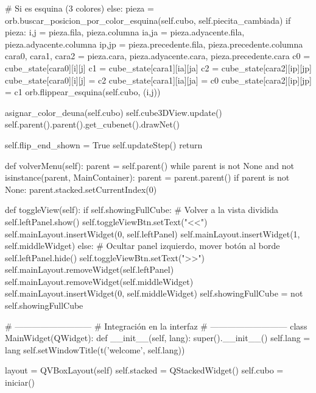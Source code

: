             # Si es esquina (3 colores)
            else:
                pieza = orb.buscar_posicion_por_color_esquina(self.cubo, self.piecita_cambiada)
                if pieza:
                    i,j   = pieza.fila, pieza.columna
                    ia,ja = pieza.adyacente.fila, pieza.adyacente.columna
                    ip,jp = pieza.precedente.fila, pieza.precedente.columna
                    cara0, cara1, cara2 = pieza.cara, pieza.adyacente.cara, pieza.precedente.cara
                    c0 = cube_state[cara0][i][j]
                    c1 = cube_state[cara1][ia][ja]
                    c2 = cube_state[cara2][ip][jp]
                    cube_state[cara0][i][j] = c2
                    cube_state[cara1][ia][ja] = c0
                    cube_state[cara2][ip][jp] = c1
                    orb.flippear_esquina(self.cubo, (i,j))

            asignar_color_deuna(self.cubo)
            self.cube3DView.update()
            self.parent().parent().get_cubenet().drawNet()

            self.flip_end_shown = True
            self.updateStep()
            return

    def volverMenu(self):
        parent = self.parent()
        while parent is not None and not isinstance(parent, MainContainer):
            parent = parent.parent()
        if parent is not None:
            parent.stacked.setCurrentIndex(0)  

    def toggleView(self):
        if self.showingFullCube:
            # Volver a la vista dividida
            self.leftPanel.show()
            self.toggleViewBtn.setText("<<")
            self.mainLayout.insertWidget(0, self.leftPanel)
            self.mainLayout.insertWidget(1, self.middleWidget)
        else:
            # Ocultar panel izquierdo, mover botón al borde
            self.leftPanel.hide()
            self.toggleViewBtn.setText(">>")
            self.mainLayout.removeWidget(self.leftPanel)
            self.mainLayout.removeWidget(self.middleWidget)
            self.mainLayout.insertWidget(0, self.middleWidget)
        self.showingFullCube = not self.showingFullCube


# ---------------------------
# Integración en la interfaz
# ---------------------------
class MainWidget(QWidget):
    def __init__(self, lang):
        super().__init__()
        self.lang = lang
        self.setWindowTitle(t('welcome', self.lang))  

        layout = QVBoxLayout(self)
        self.stacked = QStackedWidget()
        self.cubo = iniciar()


